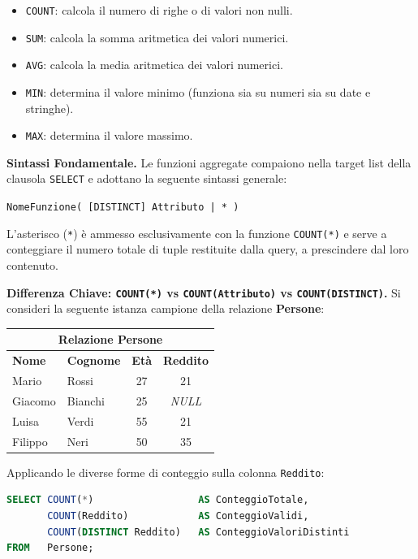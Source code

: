 \documentclass[12pt]{extarticle}
\begin{document}
\begin{itemize}
    \item \texttt{COUNT}: calcola il numero di righe o di valori non nulli.
    \item \texttt{SUM}: calcola la somma aritmetica dei valori numerici.
    \item \texttt{AVG}: calcola la media aritmetica dei valori numerici.
    \item \texttt{MIN}: determina il valore minimo (funziona sia su numeri sia su date e stringhe).
    \item \texttt{MAX}: determina il valore massimo.
\end{itemize}

\medskip
\noindent \textbf{Sintassi Fondamentale.} Le funzioni aggregate compaiono nella target list della clausola \texttt{SELECT} e adottano la seguente sintassi generale:
\begin{center}
\texttt{NomeFunzione( [DISTINCT] Attributo | * )}
\end{center}
L'asterisco (\texttt{*}) è ammesso esclusivamente con la funzione \texttt{COUNT(*)} e serve a conteggiare il numero totale di tuple restituite dalla query, a prescindere dal loro contenuto.

\medskip
\noindent \textbf{Differenza Chiave: \texttt{COUNT(*)} vs \texttt{COUNT(Attributo)} vs \texttt{COUNT(DISTINCT)}.} Si consideri la seguente istanza campione della relazione \textbf{Persone}:

\begin{center}
\small
\begin{tabular}{llcc}
    \toprule
    \multicolumn{4}{c}{\textbf{Relazione Persone}} \\
    \midrule
    \textbf{Nome} & \textbf{Cognome} & \textbf{Età} & \textbf{Reddito} \\
    \midrule
    Mario   & Rossi   & 27 & 21 \\
    Giacomo & Bianchi & 25 & \textit{NULL} \\
    Luisa   & Verdi   & 55 & 21 \\
    Filippo & Neri    & 50 & 35 \\
    \bottomrule
\end{tabular}
\end{center}

\medskip
\noindent Applicando le diverse forme di conteggio sulla colonna \texttt{Reddito}:
\begin{lstlisting}[language=SQL]
SELECT COUNT(*)                  AS ConteggioTotale,
       COUNT(Reddito)            AS ConteggioValidi,
       COUNT(DISTINCT Reddito)   AS ConteggioValoriDistinti
FROM   Persone;
\end{lstlisting}
\end{document}
